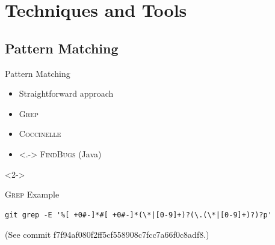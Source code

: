 \section{Techniques and Tools}
\frame{\sectionpage}

\subsection{Pattern Matching}

\begin{frame}[fragile]{Pattern Matching}

  \begin{itemize}
    \item Straightforward approach
    \item \textsc{Grep}

    \addtocounter{beamerpauses}{2}

    \item<+-> \textsc{Coccinelle}
    \item<.-> \textsc{FindBugs} (Java)
  \end{itemize}

  \medskip

  \begin{uncoverenv}<2->
  \begin{block}{\textsc{Grep} Example}
  \begin{lstlisting}[language=XML]
git grep -E '%[ +0#-]*#[ +0#-]*(\*|[0-9]+)?(\.(\*|[0-9]+)?)?p'
  \end{lstlisting}
  \footnotesize{(See commit f7f94af080f2ff5cf558908c7fcc7a66f0c8adf8.)}
  \end{block}
  \end{uncoverenv}

\end{frame}

